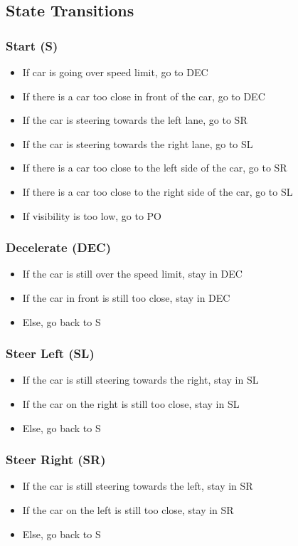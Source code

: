 \documentclass[10pt,letterpaper]{article}
\begin{document}
\newpage
\subsection{State Transitions}
\subsubsection{Start (S)}
\begin{itemize}
	\item{If car is going over speed limit, go to DEC}
	\item{If there is a car too close in front of the car, go to DEC}
	\item{If the car is steering towards the left lane, go to SR}
	\item{If the car is steering towards the right lane, go to SL}
	\item{If there is a car too close to the left side of the car, go to SR}
	\item{If there is a car too close to the right side of the car, go to SL}
	\item{If visibility is too low, go to PO} 
\end{itemize}

\subsubsection{Decelerate (DEC)}
\begin{itemize}
	\item{If the car is still over the speed limit, stay in DEC}
	\item{If the car in front is still too close, stay in DEC}
	\item{Else, go back to S}
\end{itemize}

\subsubsection{Steer Left (SL)}
\begin{itemize}
	\item{If the car is still steering towards the right, stay in SL}
	\item{If the car on the right is still too close, stay in SL}
	\item{Else, go back to S}
\end{itemize}


\subsubsection{Steer Right (SR)}
\begin{itemize}
	\item{If the car is still steering towards the left, stay in SR}
	\item{If the car on the left is still too close, stay in SR}
	\item{Else, go back to S}
\end{itemize}
\end{document}
